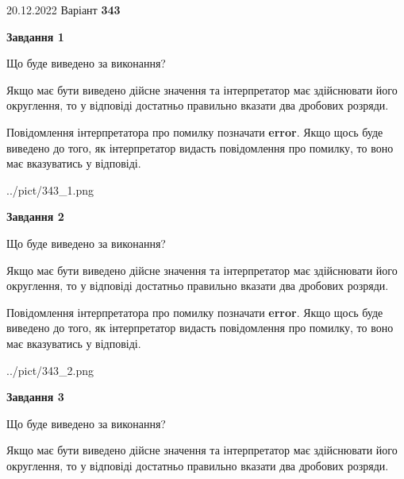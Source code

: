 \documentclass[12pt, ukrainian]{article}
\begin{document}
{20.12.2022 Варіант \No \textbf { 343 }\par}
{
\begin {Large}

{\begin {center}\textbf{Завдання 1}\end {center}}\par
Що буде виведено за виконання? \par

Якщо має бути виведено дійсне значення та інтерпретатор має здійснювати його округлення, 
то у відповіді достатньо правильно вказати два дробових розряди.

Повідомлення інтерпретатора про помилку позначати \textbf{error}.
Якщо щось буде виведено до того, як інтерпретатор видасть повідомлення про помилку, 
то воно має вказуватись у відповіді. \par

\begin{center}
	{../pict/343_1.png}
\end{center}
\newpage

{\begin {center}\textbf{Завдання 2}\end {center}}\par
Що буде виведено за виконання? \par

Якщо має бути виведено дійсне значення та інтерпретатор має здійснювати його округлення, 
то у відповіді достатньо правильно вказати два дробових розряди.

Повідомлення інтерпретатора про помилку позначати \textbf{error}.
Якщо щось буде виведено до того, як інтерпретатор видасть повідомлення про помилку, 
то воно має вказуватись у відповіді. \par

\begin{center}
	{../pict/343_2.png}
\end{center}
\newpage

{\begin {center}\textbf{Завдання 3}\end {center}}\par
Що буде виведено за виконання? \par

Якщо має бути виведено дійсне значення та інтерпретатор має здійснювати його округлення, 
то у відповіді достатньо правильно вказати два дробових розряди.


\end{Large}}
\end{document}
